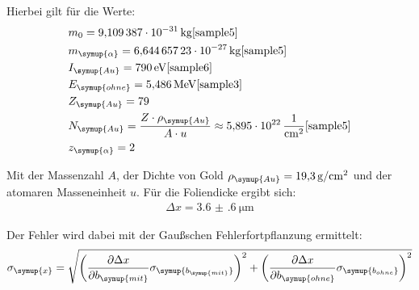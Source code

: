 Hierbei gilt für die Werte:
\begin{align*}
  &m_0 = \SI{9.109387e-31}{\kilo\gram}   \text{\cite{sample5}}\\
  &m_{\symup{\alpha}} = \SI{6.64465723e-27}{\kilo\gram} \text{\cite{sample5}}\\
  &I_{\symup{Au}} = \SI{790}{\eV} \text{\cite{sample6}}\\
  &E_{\symup{ohne}} = \SI{5.486}{\mega\eV}   \text{\cite{sample3}} \\
  &Z_{\symup{Au}} = 79 \\
  &N_{\symup{Au}} = \frac{Z \cdot \rho_{\symup{Au}}}{A \cdot u} \approx \SI{5.895e22}{\per\centi\meter\squared} \text{\cite{sample5}}\\
  &z_{\symup{\alpha}} = 2 \\
\end{align*}

Mit der Massenzahl $A$, der Dichte von Gold $\rho_{\symup{Au}}= \SI{19.3}{\gram\per\centi\meter\squared}$ \cite{sample7} und der atomaren Masseneinheit $u$.
Für die Foliendicke ergibt sich:
\begin{align*}
  \Delta x = \SI{3.6(6)}{\micro\meter}
\end{align*}

Der Fehler wird dabei mit der Gaußschen Fehlerfortpflanzung ermittelt:
\begin{align*}
  \sigma_{\symup{x}} = \sqrt{\left(\frac{\partial \Delta x}{\partial b_{\symup{mit}}}\sigma_{\symup{b_{\symup{mit}}}}\right)^2 + \left(\frac{\partial \Delta x}{\partial b_{\symup{ohne}}}\sigma_{\symup{b_{ohne}}}\right)^2}
\end{align*}

